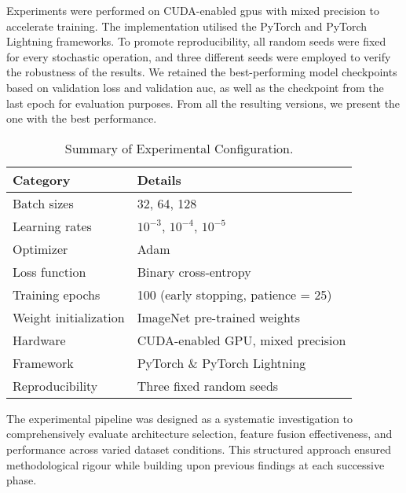 Experiments were performed on CUDA-enabled \acp{gpu} with mixed precision to accelerate training. The implementation utilised the PyTorch and PyTorch Lightning frameworks. To promote reproducibility, all random seeds were fixed for every stochastic operation, and three different seeds were employed to verify the robustness of the results. We retained the best-performing model checkpoints based on validation loss and validation \ac{auc}, as well as the checkpoint from the last epoch for evaluation purposes. From all the resulting versions, we present the one with the best performance.

\begin{table}[ht]
\centering
\caption{Summary of Experimental Configuration.}
\begin{tabular}{ll}
\toprule
\textbf{Category} & \textbf{Details} \\
\midrule
Batch sizes           & 32, 64, 128 \\
Learning rates        & $10^{-3}$, $10^{-4}$, $10^{-5}$ \\
Optimizer             & Adam \\
Loss function         & Binary cross-entropy \\
Training epochs       & 100 (early stopping, patience = 25) \\
Weight initialization & ImageNet pre-trained weights \\
\midrule
Hardware              & CUDA-enabled GPU, mixed precision \\
Framework             & PyTorch \& PyTorch Lightning \\
Reproducibility       & Three fixed random seeds \\
\bottomrule
\end{tabular}
\label{tab:experimental-setup}
\end{table}



The experimental pipeline was designed as a systematic investigation to comprehensively evaluate architecture selection, feature fusion effectiveness, and performance across varied dataset conditions. This structured approach ensured methodological rigour while building upon previous findings at each successive phase.

